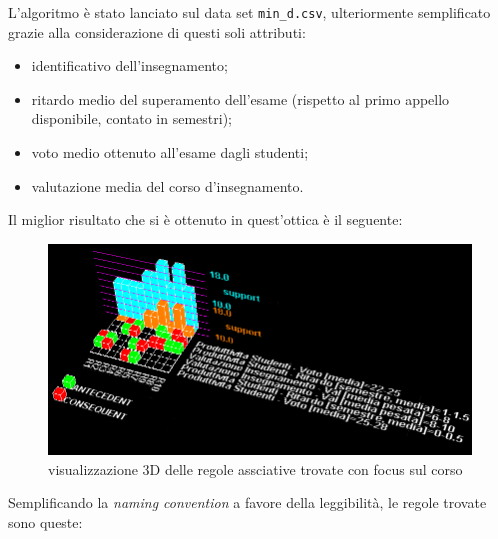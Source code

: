             L'algoritmo è stato lanciato sul data set \texttt{min\_d.csv}, ulteriormente semplificato grazie alla considerazione di questi soli attributi:

            \begin{itemize}
                \item identificativo dell'insegnamento;
                \item ritardo medio del superamento dell'esame (rispetto al primo appello disponibile, contato in semestri);
                \item voto medio ottenuto all'esame dagli studenti;
                \item valutazione media del corso d'insegnamento.
            \end{itemize}

            Il miglior risultato che si è ottenuto in quest'ottica è il seguente: \\

            

            \begin{figure}
                \centering
                \caption{visualizzazione 3D delle regole assciative trovate con focus sul corso}
                \label{apriori_min_1}
	            \includegraphics[scale=0.48]{../ass/apriori_min_1.png}
            \end{figure}

            Semplificando la \textit{naming convention} a favore della leggibilità, le regole trovate sono queste:


